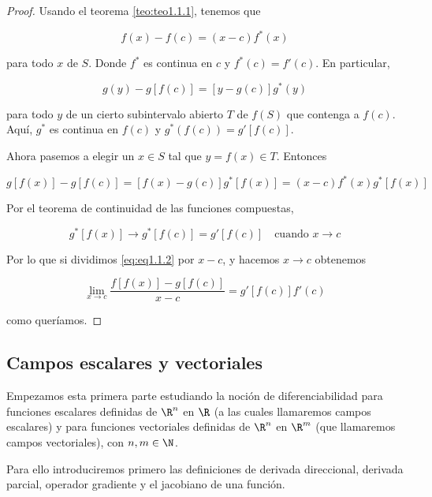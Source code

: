 \begin{proof}
    Usando el teorema \ref{teo:teo1.1.1}, tenemos que
    
    \[
    f(x) - f(c) = (x-c)f^*(x)
    \]
    
    \noindent para todo $x$ de $S$. Donde $f^*$ es continua en $c$ y $f^*(c) = f'(c)$. En particular,
    
    \[
    g(y) - g[f(c)] = [y - g(c)]g^*(y)
    \]
    
    \noindent para todo $y$ de un cierto subintervalo abierto $T$ de $f(S)$ que contenga a $f(c)$. Aquí, $g^*$ es continua en $f(c)$ y $g^*(f(c)) = g'[f(c)]$.
    
    Ahora pasemos a elegir un $x \in S$ tal que $y = f(x) \in T$. Entonces
    
    \begin{equation}\label{eq:eq1.1.2}
        g[f(x)] - g[f(c)] = [f(x) - g(c)]g^*[f(x)] = (x-c)f^*(x)g^*[f(x)]
    \end{equation}
    
    Por el teorema de continuidad de las funciones compuestas,
    
    \[
    g^*[f(x)] \rightarrow g^*[f(c)] = g'[f(c)] \quad \text{cuando $x \rightarrow c$}
    \]
    
    Por lo que si dividimos \ref{eq:eq1.1.2} por $x-c$, y hacemos $x \rightarrow c$ obtenemos
    
    \[
    \lim_{x \to c} \frac{f[f(x)] - g[f(c)]}{x-c} = g'[f(c)]f'(c)
    \]
    
    \noindent como queríamos.
\end{proof}

\subsection{Campos escalares y vectoriales}

Empezamos esta primera parte estudiando la noción de diferenciabilidad para funciones escalares definidas de $\R^n$ en $\R$ (a las cuales llamaremos campos escalares) y para funciones vectoriales definidas de $\R^n$ en $\R^m$ (que llamaremos campos vectoriales), con $n,m \in \N$.

Para ello introduciremos primero las definiciones de derivada direccional, derivada parcial, operador gradiente y el jacobiano de una función.

